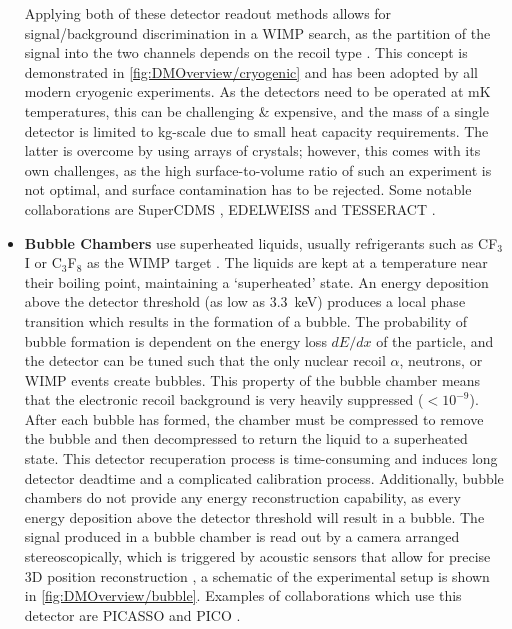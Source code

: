 \begin{itemize}
    Applying both of these detector readout methods allows for signal/background discrimination in a WIMP search, as the partition of the signal into the two channels depends on the recoil type \cite{PhysRevLett.69.3425}. This concept is demonstrated in \autoref{fig:DMOverview/cryogenic} and has been adopted by all modern cryogenic experiments. As the detectors need to be operated at mK temperatures, this can be challenging \& expensive, and the mass of a single detector is limited to kg-scale due to small heat capacity requirements. The latter is overcome by using arrays of crystals; however, this comes with its own challenges, as the high surface-to-volume ratio of such an experiment is not optimal, and surface contamination has to be rejected. Some notable collaborations are SuperCDMS \cite{SuperCDMS:2014cds}, EDELWEISS \cite{Benoit:2002hf} and TESSERACT \cite{TESSERACT:2025tfw}.
    
    \item \textbf{Bubble Chambers} use superheated liquids, usually refrigerants such as CF$_3$I or C$_3$F$_8$ as the WIMP target \cite{Schumann:2019eaa}. The liquids are kept at a temperature near their boiling point, maintaining a `superheated' state. An energy deposition above the detector threshold (as low as 3.3~keV) produces a local phase transition which results in the formation of a bubble. The probability of bubble formation is dependent on the energy loss $dE/dx$ of the particle, and the detector can be tuned such that the only nuclear recoil $\alpha$, neutrons, or WIMP events create bubbles. This property of the bubble chamber means that the electronic recoil background is very heavily suppressed ($< 10^{-9}$). After each bubble has formed, the chamber must be compressed to remove the bubble and then decompressed to return the liquid to a superheated state. This detector recuperation process is time-consuming and induces long detector deadtime and a complicated calibration process. Additionally, bubble chambers do not provide any energy reconstruction capability, as every energy deposition above the detector threshold will result in a bubble. The signal produced in a bubble chamber is read out by a camera arranged stereoscopically, which is triggered by acoustic sensors that allow for precise 3D position reconstruction \cite{edfraser:thesis}, a schematic of the experimental setup is shown in \autoref{fig:DMOverview/bubble}. Examples of collaborations which use this detector are PICASSO \cite{Behnke:2016lsk} and PICO \cite{PICO:2015pux}.
    

\end{itemize}

